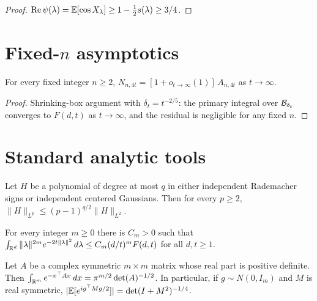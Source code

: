 \begin{proof}\leanok
$\operatorname{Re}\psi(\lambda)=\mathbb{E}[\cos X_\lambda]\ge 1-\frac12 s(\lambda)\ge 3/4$.
\end{proof}

\section{Fixed-$n$ asymptotics}

\begin{lemma}\label{fact:fixed-n}
\leanok
For every fixed integer $n\ge 2$,
$N_{n,4t}=[1+o_{t\to\infty}(1)]\,A_{n,4t}$ as $t\to\infty$.
\end{lemma}

\begin{proof}\leanok
Shrinking-box argument with $\delta_t=t^{-2/5}$: the primary integral
over $\mathcal{B}_{\delta_t}$ converges to $F(d,t)$ as $t\to\infty$,
and the residual is negligible for any fixed $n$.
\end{proof}

\section{Standard analytic tools}

\begin{lemma}\label{lem:hc}
\leanok
Let $H$ be a polynomial of degree at most $q$ in either independent
Rademacher signs or independent centered Gaussians.
Then for every $p\ge 2$,
$\|H\|_{L^p}\le (p-1)^{q/2}\|H\|_{L^2}$.
\end{lemma}

\begin{lemma}\label{lem:gaussian-radial}
\leanok
For every integer $m\ge 0$ there is $C_m>0$ such that
$\int_{\mathbb{R}^d}\|\lambda\|^{2m}e^{-2t\|\lambda\|^2}\,d\lambda
\le C_m(d/t)^m F(d,t)$ for all $d,t\ge 1$.
\end{lemma}

\begin{lemma}\label{lem:gaussian-quadratic}
\leanok
Let $A$ be a complex symmetric $m\times m$ matrix whose real part is
positive definite. Then
$\int_{\mathbb{R}^m}e^{-x^\top A x}\,dx=\pi^{m/2}\det(A)^{-1/2}$.
In particular, if $g\sim N(0,I_m)$ and $M$ is real symmetric,
$|\mathbb{E}[e^{ig^\top Mg/2}]|=\det(I+M^2)^{-1/4}$.
\end{lemma}

